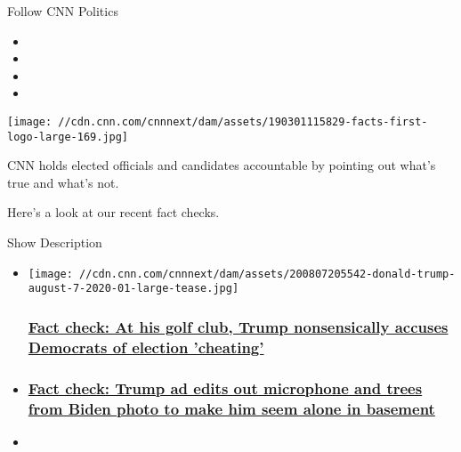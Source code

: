 Follow CNN Politics

\begin{itemize}
\item
\item
\item
\item
\end{itemize}

\texttt{[image: //cdn.cnn.com/cnnnext/dam/assets/190301115829-facts-first-logo-large-169.jpg]}

CNN holds elected officials and candidates accountable by pointing out
what's true and what's not.

Here's a look at our recent fact checks.

Show Description

\begin{itemize}
\item
  \href{/2020/08/07/politics/donald-trump-press-briefing-democrats-cheating-election-fact-check/index.html}{}

  \texttt{[image: //cdn.cnn.com/cnnnext/dam/assets/200807205542-donald-trump-august-7-2020-01-large-tease.jpg]}

  \hypertarget{fact-check-at-his-golf-club-trump-nonsensically-accuses-democrats-of-election-cheating-}{%
  \subsubsection{\texorpdfstring{\href{/2020/08/07/politics/donald-trump-press-briefing-democrats-cheating-election-fact-check/index.html}{Fact
  check: At his golf club, Trump nonsensically accuses Democrats of
  election 'cheating'
  }}{Fact check: At his golf club, Trump nonsensically accuses Democrats of election 'cheating' }}\label{fact-check-at-his-golf-club-trump-nonsensically-accuses-democrats-of-election-cheating-}}
\item
  \hypertarget{fact-check-trump-ad-edits-out-microphone-and-trees-from-biden-photo-to-make-him-seem-alone-in-basement}{%
  \subsubsection{\texorpdfstring{\href{/2020/08/05/politics/fact-check-trump-ad-biden-basement-delaware-photos-iowa/index.html}{Fact
  check: Trump ad edits out microphone and trees from Biden photo to
  make him seem alone in
  basement}}{Fact check: Trump ad edits out microphone and trees from Biden photo to make him seem alone in basement}}\label{fact-check-trump-ad-edits-out-microphone-and-trees-from-biden-photo-to-make-him-seem-alone-in-basement}}
\item
  \hypertarget{fact-check-with-vote-by-mail-expansion-can-nevada-voters-cast-ballots-after-election-day}{%
}
\end{itemize}
